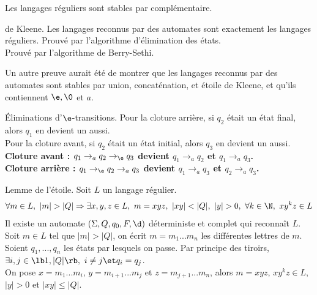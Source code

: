 \documentclass[french, 11pt]{article}
\renewcommand*{\S}{\Sigma}
\renewcommand*{\ra}{\Rightarrow}
\begin{document}
\begin{exercice}{}{}
    Les langages réguliers sont stables par complémentaire.
\end{exercice}

\begin{thm}{de Kleene.}{}
    Les langages reconnus par des automates sont exactement les langages réguliers.
    \tcblower
    \boxed{\ra} Prouvé par l'algorithme d'élimination des états.\\
    \boxed{\la} Prouvé par l'algorithme de Berry-Sethi.
\end{thm}

\begin{prop}{}{}
    Un autre preuve aurait été de montrer que les langages reconnus par des automates sont stables par union, concaténation, et étoile de Kleene, et qu'ils contiennent $\e,\0$ et $a$.
\end{prop}

\begin{defi}{Éliminations d'$\e$-transitions.}{}
    Pour la cloture arrière, si $q_2$ était un état final, alors $q_1$ en devient un aussi.\\
    Pour la cloture avant, si $q_2$ était un état initial, alors $q_3$ en devient un aussi.\\
    \bf{Cloture avant :} $q_1 \to_a q_2 \to_\e q_3$ devient $q_1\to_a q_2$ et $q_1\to_a q_3$.\\
    \bf{Cloture arrière :} $q_1\to_\e q_2 \to_a q_3$ devient $q_1\to_a q_3$ et $q_2\to_a q_3$.
\end{defi}

\vspace*{-0.3cm}

\begin{thm}{Lemme de l'étoile.}{}
    Soit $L$ un langage régulier.
    \begin{equation*}
        \forall m \in L, ~ |m|>|Q| \ra \exists x,y,z\in L, ~ m=xyz, ~ |xy|<|Q|, ~ |y|>0, ~ \forall k \in \N, ~ xy^kz\in L
    \end{equation*}
    \tcblower
    Il existe un automate $(\S,Q,q_0,F,\d)$ déterministe et complet qui reconnaît $L$.\\
    Soit $m\in L$ tel que $|m|>|Q|$, on écrit $m=m_1...m_n$ les différentes lettres de $m$.\\
    Soient $q_1,...,q_n$ les états par lesquels on passe. Par principe des tiroirs, $\exists i,j \in \lb1,|Q|\rb, ~ i\neq j \et q_i = q_j$.\\
    On pose $x=m_1...m_{i}$, $y=m_{i+1}...m_{j}$ et $z=m_{j+1}...m_n$, alors $m=xyz$, $xy^kz\in L$, $|y|>0$ et $|xy|\leq|Q|$.
\end{thm}
\end{document}
